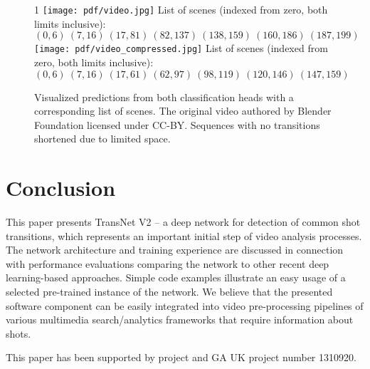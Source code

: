 \documentclass[sigconf]{acmart}
\def\longversion{1}
\begin{document}
\begin{figure}
    \centering
    \if\longversion1
        \texttt{[image: pdf/video.jpg]}
        List of scenes (indexed from zero, both limits inclusive):
        $$(  0,  6)\ (  7,  16)\ ( 17,  81)\ ( 82, 137)\ (138, 159)\ (160, 186)\ (187, 199)$$
    \else
        \texttt{[image: pdf/video\_compressed.jpg]}
        List of scenes (indexed from zero, both limits inclusive):
        $$(  0,  6)\ (  7,  16)\ ( 17,  61)\ ( 62, 97)\ (98, 119)\ (120, 146)\ (147, 159)$$
    \fi
    \caption{Visualized predictions from both classification heads with a corresponding list of scenes. The original video authored by Blender Foundation licensed under CC-BY. Sequences with no transitions shortened due to limited space.}
    \label{fig:example_predictions}
\end{figure}


\balance
\section{Conclusion}
This paper presents TransNet V2 -- a deep network for detection of common shot transitions, which represents an important initial step of video analysis processes. The network architecture and training experience are discussed in connection with performance evaluations comparing the network to other recent deep learning-based approaches. Simple code examples illustrate an easy usage of a selected pre-trained instance of the network. We believe that the presented software component can be easily integrated into video pre-processing pipelines of various multimedia search/analytics frameworks that require information about shots.

\begin{acks}
This paper has been supported by  project  and GA UK project number 1310920.
\end{acks}



\end{document}
